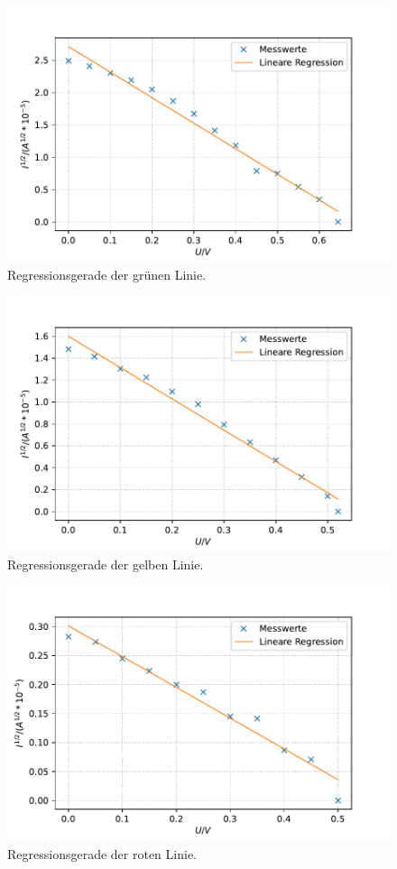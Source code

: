 \begin{figure}
  \center
  \caption{Regressionsgerade der grünen Linie.}\label{fig:spek3}
  \includegraphics[width=0.8\linewidth]{pictures/spek3.pdf}
\end{figure}

\begin{figure}
  \center
  \caption{Regressionsgerade der gelben Linie.}\label{fig:spek4}
  \includegraphics[width=0.8\linewidth]{pictures/spek4.pdf}
\end{figure}

\begin{figure}
  \center
  \caption{Regressionsgerade der roten Linie.}\label{fig:spek5}
  \includegraphics[width=0.8\linewidth]{pictures/spek5.pdf}
\end{figure}


